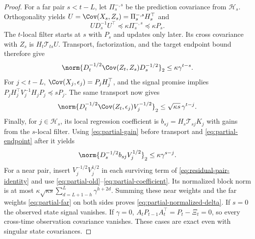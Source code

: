 \begin{proof}
For a far pair $s<t-L$, let $\Pi_s^{-,s}$ be the prediction covariance
from $\mathcal H_s$. Orthogonality yields
$U=\Cov(X_s,Z_s)=\Pi_s^{-,s}H_s^\top$ and
\[
 U D_s^{-1}U^\top\preceq\kappa\Pi_s^{-,s}\preceq\kappa P_s.
\]
The $t$-local filter starts at $s$ with $P_s$ and updates only later.
Its cross covariance with $Z_s$ is $H_t\mathcal T_{ts}U$.
Transport, factorization, and the target endpoint bound therefore give
\begin{equation}
 \norm{D_t^{-1/2}\Cov(Z_t,Z_s)D_s^{-1/2}}_2
 \le\kappa\gamma^{t-s}.
 \label{eq:partial-far}
\end{equation}
For $j<t-L$, $\Cov(X_j,\epsilon_j)=P_jH_j^\top$, and the signal promise
implies
$P_jH_j^\top V_j^{-1}H_jP_j\preceq sP_j$.
The same transport now gives
\begin{equation}
 \norm{D_t^{-1/2}\Cov(Z_t,\epsilon_j)V_j^{-1/2}}_2
 \le\sqrt{\kappa s}\,\gamma^{t-j}.
 \label{eq:partial-old}
\end{equation}
Finally, for $j\in\mathcal H_s$, its local regression coefficient is
$b_{sj}=H_s\mathcal T_{sj}K_j$ with gains from the $s$-local filter.
Using \eqref{eq:partial-gain} before transport and
\eqref{eq:partial-endpoint} after it yields
\begin{equation}
 \norm{D_s^{-1/2}b_{sj}V_j^{1/2}}_2\le\kappa\gamma^{s-j}.
 \label{eq:partial-coefficient}
\end{equation}
For a near pair, insert $V_j^{-1/2}V_j^{1/2}$ in each surviving term of
\eqref{eq:residual-pair-identity} and use
\eqref{eq:partial-old}--\eqref{eq:partial-coefficient}. Its normalized
block norm is at most
$\kappa\sqrt{\kappa s}\sum_{d=L+1-h}^L\gamma^{h+2d}$.
Summing these near weights and the far weights
\eqref{eq:partial-far} on both sides proves
\eqref{eq:partial-normalized-delta}.
If $s=0$ the observed state signal vanishes. If $\gamma=0$,
$A_tP_{t-1}A_t^\top=P_t-\Xi_t=0$, so every cross-time observation
covariance vanishes. These cases are exact even with singular state
covariances.
\end{proof}

